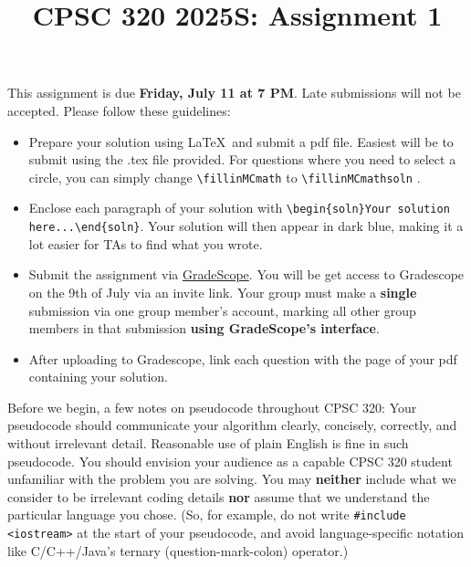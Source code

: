\documentclass[11pt,fleqn]{exam}
\author{}
\date{}
\title{CPSC 320 2025S: Assignment 1}
\newcommand{\fillinMCmath}[1]{\begin{tikzpicture}\draw circle [radius=0.5em];\end{tikzpicture}\ #1}
\newcommand{\fillinMCmathsoln}[1]{\begin{tikzpicture}\draw[black, fill=blue] circle [radius=0.5em];\end{tikzpicture}\ #1}
\newenvironment{soln}{\color{solnblue}}{}
\begin{document}
\maketitle
\vspace{-0.5in} This assignment is due \textbf{Friday, July 11 at 7 PM}. Late submissions will not be accepted. Please follow these guidelines:
\begin{itemize}
	\item Prepare your  solution using \LaTeX \ and submit  a pdf file. Easiest will be to submit using
	      the .tex file provided. For questions where you  need to select a circle, you can simply
	      change \verb~\fillinMCmath~ to \verb~\fillinMCmathsoln~ .

	\item Enclose each paragraph of your solution with
	      \verb~\begin{soln}Your solution here...\end{soln}~.
	      \begin{soln}Your  solution will  then appear  in dark  blue\end{soln}, making  it a  lot
	      easier for TAs to find what you wrote.

	\item   Submit   the    assignment   via   \href{https://gradescope.ca/}{GradeScope}. You will be get access to Gradescope on the 9th of July via an invite link. Your group must make  a \textbf{single} submission via one
	      group member's account, marking all other group members in that submission \textbf{using
		      GradeScope's interface}.

	\item  After uploading  to  Gradescope, link  each  question  with the  page  of your  pdf
	      containing your solution.
\end{itemize}

Before we  begin, a few  notes on pseudocode throughout  CPSC 320: Your  pseudocode should
communicate your algorithm  clearly, concisely, correctly, and  without irrelevant detail.
Reasonable use  of plain  English is  fine in  such pseudocode.  You should  envision your
audience as a capable CPSC 320 student unfamiliar with the problem you are solving. You may \textbf{neither} include what we consider to be irrelevant coding details \textbf{nor} assume that  we understand the particular  language you
chose. (So, for example,  do not write \texttt{\#include <iostream>} at  the start of your
pseudocode,   and    avoid   language-specific   notation   like    C/C++/Java's   ternary
(question-mark-colon) operator.)
\end{document}
